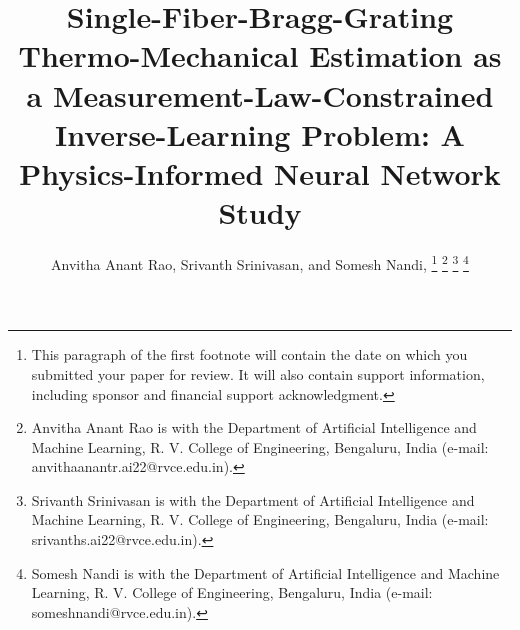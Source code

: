 \documentclass[journal,twoside,web]{ieeecolor}
\begin{document}
\title{Single-Fiber-Bragg-Grating Thermo-Mechanical Estimation as a Measurement-Law-Constrained Inverse-Learning Problem: A Physics-Informed Neural Network Study}
\author{Anvitha Anant Rao, Srivanth Srinivasan, and Somesh Nandi, 
\thanks{This paragraph of the first footnote will contain the date on
which you submitted your paper for review. It will also contain support
information, including sponsor and financial support acknowledgment.}
\thanks{Anvitha Anant Rao is with the Department of Artificial Intelligence and Machine Learning, R. V. College of Engineering, Bengaluru, India (e-mail: anvithaanantr.ai22@rvce.edu.in). }
\thanks{Srivanth Srinivasan is with the Department of Artificial Intelligence and Machine Learning, R. V. College of Engineering, Bengaluru, India (e-mail: srivanths.ai22@rvce.edu.in).}
\thanks{Somesh Nandi is with the Department of Artificial Intelligence and Machine Learning, R. V. College of Engineering, Bengaluru, India (e-mail: someshnandi@rvce.edu.in).}}
\end{document}
